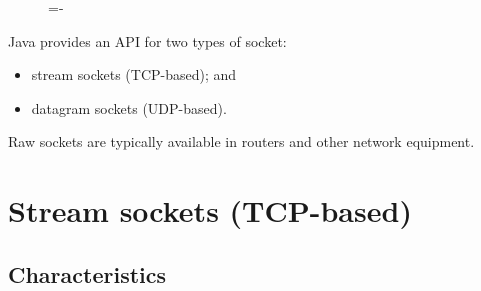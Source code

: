 \documentclass[a4paper]{systems-software}
\begin{document}
\begin{figure}[H]
	\lineskip=-\fboxrule
\end{figure}

Java provides an API for two types of socket:
\begin{itemize}
	\item stream sockets (TCP-based); and
	\item datagram sockets (UDP-based).
\end{itemize}

Raw sockets are typically available in routers and other network equipment.


\section*{Stream sockets (TCP-based)}

\subsection*{Characteristics}
\end{document}
